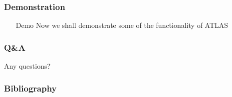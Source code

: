 \begin{frame}
\frametitle{Demonstration}%
\begin{itemize}[<+->]
\item[Demo] Now we shall demonstrate some of the functionality of ATLAS
\end{itemize}
\end{frame}

\begin{frame}
\frametitle{Q\&A}%
\begin{description}[<+->]
\item[?]Any questions?
\end{description}
\end{frame}

\begin{frame}[allowframebreaks]
\frametitle{Bibliography}

\end{frame}



